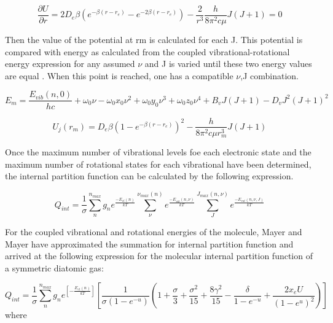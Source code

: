 \documentclass[]{aelab_aiaa-tc}%
\begin{document}
\begin{equation}
\frac{\partial U}{\partial r} = 2D_{e}\beta (e^{-\beta(r-r_{e})} - e^{-2\beta(r-r_{e})}) - \frac{2}{r^3} \frac{h}{8\pi^2c\mu}J(J+1) = 0
\end{equation}

Then the value of the potential at rm is calculated for each J. This potential is compared with energy as calculated from the coupled vibrational-rotational energy expression for any assumed $\nu$ and J is varied until these two energy values are equal . When this point is reached, one has a compatible
$\nu$,J combination.

\begin{equation}
E_{m} = \frac{E_{vib}(n,0)}{hc} + \omega_{0}\nu - \omega_{0}x_{0}\nu^2 + \omega_{0}y_{0}\nu^3 + \omega_{0}z_{0}\nu^4 + B_{v}J(J+1) - D_{v}J^2(J+1)^2
\end{equation}


\begin{equation}
U_{j}(r_{m}) = D_{e}\beta (1 - e^{-\beta(r-r_{e})})^2 - \frac{h}{8\pi^2c\mu r_{m}^3}J(J+1)
\end{equation}

Once the maximum number of vibrational levels foe each electronic state and the maximum number of rotational states for each vibrational have been determined, the internal partition function can be calculated by the following expression.

\begin{equation}
Q_{int} = \frac{1}{\sigma} \sum_{n}^{n_{max}} g_n e^{\frac{-E_{el}(n)}{kT}} \sum_{\nu}^{\nu_{max}(n)} e^{\frac{-E_{vib}(n,\nu)}{kT}} \sum_{J}^{J_{max}(n,\nu)} e^{\frac{-E_{rot}(n,\nu,J)}{kT}}
\end{equation}

For the coupled vibrational and rotational energies of the molecule, Mayer and Mayer \cite{mayer:2} have approximated
the summation for internal partition function and arrived at the following expression for the molecular internal partition function of a symmetric diatomic gas:


\begin{equation}
Q_{int} = \frac{1}{\sigma} \sum_{n}^{n_{max}} g_{n} e^{\left[-\frac{E_{el}(n)}{kT}\right]} \left[\frac{1}{\sigma(1-e^{-u})} \left(1 + \frac{\sigma}{3} + \frac{\sigma^2}{15} + \frac{8\gamma^2}{15} - \frac{\delta}{1 - e^{-u}} + \frac{2x_{e}U}{(1-e^u)^2} \right) \right]
\end{equation}
where\\
\end{document}
